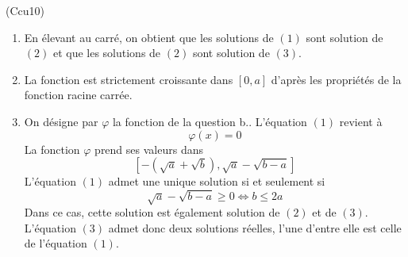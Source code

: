 \begin{tiny}(Ccu10)\end{tiny}
\begin{enumerate}
  \item En élevant au carré, on obtient que les solutions de $(1)$ sont solution de $(2)$ et que les solutions de $(2)$ sont solution de $(3)$.
  \item La fonction est strictement croissante dans $[0,a]$ d'après les propriétés de la fonction racine carrée.
  \item On désigne par $\varphi$ la fonction de la question b.. L'équation $(1)$ revient à
\begin{displaymath}
  \varphi(x) = 0
\end{displaymath}
La fonction $\varphi$ prend ses valeurs dans 
\begin{displaymath}
  \left[ -(\sqrt{a} + \sqrt{b}), \sqrt{a} - \sqrt{b-a}\right] 
\end{displaymath}
L'équation $(1)$ admet une unique solution si et seulement si
\begin{displaymath}
  \sqrt{a} - \sqrt{b-a} \geq 0 \Leftrightarrow b \leq 2a
\end{displaymath}
Dans ce cas, cette solution est également solution de $(2)$ et de $(3)$. L'équation $(3)$ admet donc deux solutions réelles, l'une d'entre elle est celle de l'équation $(1)$.
\end{enumerate}
